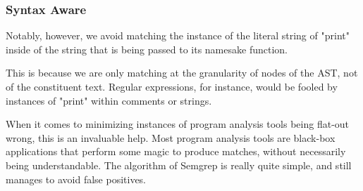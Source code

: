 \documentclass[aspectratio=169, handout]{beamer}
\begin{document}
 \begin{frame}[fragile]
   \frametitle{Syntax Aware}

   Notably, however, we avoid matching the instance of the literal string
   of "print" inside of the string that is being passed to its namesake function.

   \pause
   \vspace{\fill}

   This is because we are only matching at the granularity of nodes of the AST,
   not of the constituent text. Regular expressions, for instance, would be fooled
   by instances of "print" within comments or strings.

   \pause
   \vspace{\fill}

   When it comes to minimizing instances of program analysis tools being flat-out
   wrong, this is an invaluable help. Most program analysis tools are black-box
   applications that perform some magic to produce matches, without necessarily
   being understandable. The algorithm of Semgrep is really quite simple, and
   still manages to avoid false positives.
 \end{frame}
\end{document}
